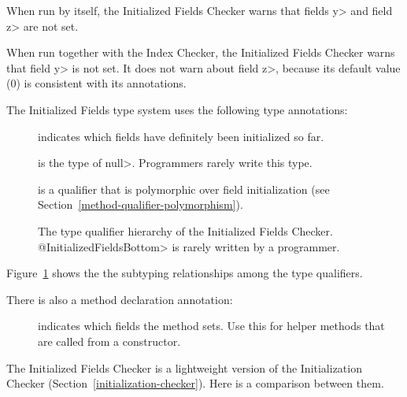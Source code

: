 When run by itself, the Initialized Fields Checker warns that fields \<y>
and field \<z> are not set.

When run together with the Index Checker, the Initialized Fields Checker
warns that field \<y> is not set.  It does not warn about field \<z>,
because its default value (0) is consistent with its annotations.



The Initialized Fields type system uses the following type annotations:
\begin{description}
\item[]
  indicates which fields have definitely been initialized so far.
\item[]
  is the type of \<null>.  Programmers rarely write this type.
\item[]
  is a qualifier that is polymorphic over field initialization (see
  Section~\ref{method-qualifier-polymorphism}).
\end{description}

\begin{figure}
\caption{The type qualifier hierarchy of the Initialized Fields Checker.
\<@InitializedFieldsBottom> is rarely written by a programmer.}
\label{fig-initialized-fields-hierarchy}
\end{figure}

Figure~\ref{fig-initialized-fields-hierarchy} shows the the subtyping
relationships among the type qualifiers.

There is also a method declaration annotation:

\begin{description}
\item[]
  indicates which fields the method sets.  Use this for helper methods that
  are called from a constructor.
\end{description}



The Initialized Fields Checker is a lightweight version of the  Initialization Checker
(Section~\ref{initialization-checker}).  Here is a comparison between them.

